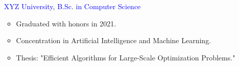 \documentclass[11pt, oneside]{article}
\begin{document}
\begin{itemize}[leftmargin=0cm]
    \item[\textcolor{blue}{XYZ University, B.Sc. in Computer Science}]
        \begin{itemize}[leftmargin=*]
            \item Graduated with honors in 2021.
            \item Concentration in Artificial Intelligence and Machine Learning.
            \item Thesis: "Efficient Algorithms for Large-Scale Optimization Problems."
        \end{itemize}
\end{itemize}
\end{document}
